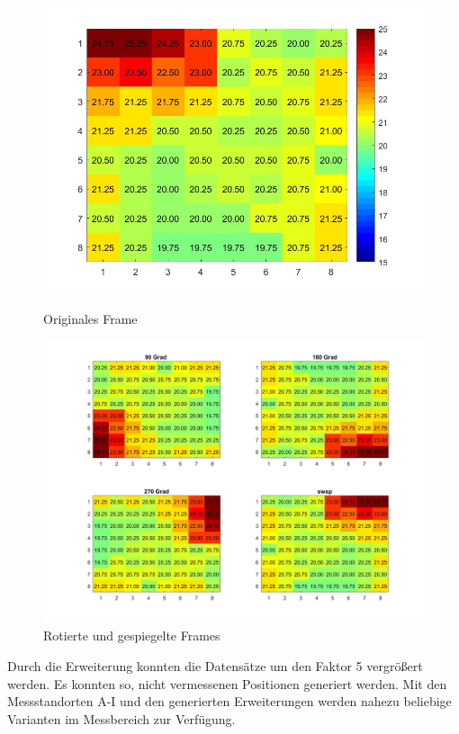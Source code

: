 \begin{figure}[!ht]
	\centering
	\begin{minipage}[c]{0.35\linewidth}
	\centering
	\includegraphics[width=.8\linewidth]{fig/original}
	\caption{Originales Frame}
	\label{fig:original}
	\end{minipage}
	\hfill
	\begin{minipage}[c]{0.6\linewidth  }
\includegraphics[width=1\linewidth]{fig/rotated}
\caption{Rotierte und gespiegelte Frames}
\label{fig:rotated}
	\end{minipage}
\end{figure}


Durch die Erweiterung konnten die Datensätze um den Faktor 5 vergrößert werden. Es konnten so, nicht vermessenen Positionen generiert werden. Mit den Messstandorten A-I und den generierten Erweiterungen werden nahezu beliebige Varianten im Messbereich zur Verfügung.


